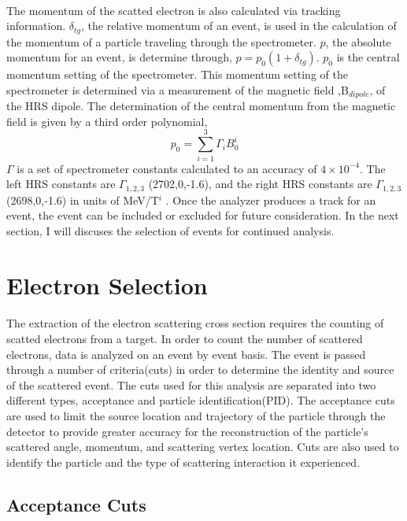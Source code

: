 \paragraph{}The momentum of the scatted electron is also calculated via tracking information.  $\delta_{tg}$, the relative momentum of an event, is used in the calculation of the momentum of a particle traveling through the spectrometer. $p$, the absolute momentum for an event, is determine through, $p = p_0(1+\delta_{tg})$. $p_0$ is the central momentum setting of the spectrometer. This momentum setting of the spectrometer is determined via a measurement of the magnetic field ,B$_{dipole}$, of the HRS dipole. The determination of the central momentum from the magnetic field is given by a third order polynomial,
\begin{equation}
p_0 = \sum_{i=1}^{3} \Gamma_iB_0^i
\end{equation}
$\Gamma$ is a set of spectrometer constants calculated to an accuracy of $4\times10^{-4}$. The left HRS constants are $\Gamma_{1,2,3}$ (2702,0,-1.6), and the right HRS constants are $\Gamma_{1,2,3}$ (2698,0,-1.6) in units of MeV/T$^i$ \cite{HallA}. Once the analyzer produces a track for an event, the event can be included or excluded for future consideration. In the next section, I will discuses the selection of events for continued analysis.
 
\section{Electron Selection}\label{sec:ES}
\paragraph{} The extraction of the electron scattering cross section requires the counting of scatted electrons from a target. In order to count the number of scattered electrons, data is analyzed on an event by event basis. The event is passed through a number of criteria(cuts) in order to determine the identity and source of the scattered event. The cuts used for this analysis are separated into two different types, acceptance and particle identification(PID). The acceptance cuts are used to limit the source location and trajectory of the particle through the detector to provide greater accuracy for the reconstruction of the particle's scattered angle, momentum, and scattering vertex location. Cuts are also used to identify the particle and the type of scattering interaction it experienced. 
\subsection{Acceptance Cuts}

